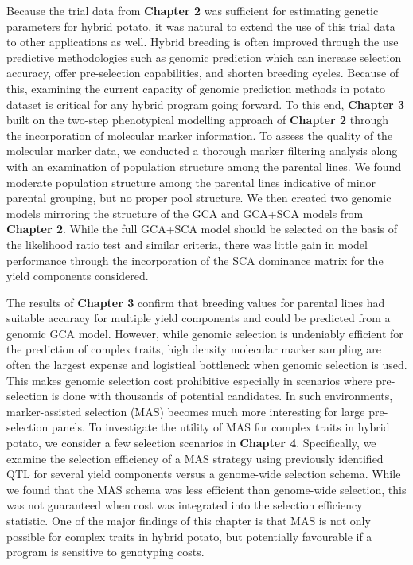 Because the trial data from \textbf{Chapter 2} was sufficient for estimating genetic parameters for hybrid potato, it was natural to extend the use of this trial data to other applications as well. Hybrid breeding is often improved through the use predictive methodologies such as genomic prediction which can increase selection accuracy, offer pre-selection capabilities, and shorten breeding cycles. Because of this, examining the current capacity of genomic prediction methods in potato dataset is critical for any hybrid program going forward. To this end, \textbf{Chapter 3} built on the two-step phenotypical modelling approach of \textbf{Chapter 2} through the incorporation of molecular marker information. To assess the quality of the molecular marker data, we conducted a thorough marker filtering analysis along with an examination of population structure among the parental lines. We found moderate population structure among the parental lines indicative of minor parental grouping, but no proper pool structure. We then created two genomic models mirroring the structure of the GCA and GCA+SCA models from \textbf{Chapter 2}. While the full GCA+SCA model should be selected on the basis of the likelihood ratio test and similar criteria, there was little gain in model performance through the incorporation of the SCA dominance matrix for the yield components considered.

The results of \textbf{Chapter 3} confirm that breeding values for parental lines had suitable accuracy for multiple yield components and could be predicted from a genomic GCA model. However, while genomic selection is undeniably efficient for the prediction of complex traits, high density molecular marker sampling are often the largest expense and logistical bottleneck when genomic selection is used. This makes genomic selection cost prohibitive especially in scenarios where pre-selection is done with thousands of potential candidates. In such environments, marker-assisted selection (MAS) becomes much more interesting for large pre-selection panels. To investigate the utility of MAS for complex traits in hybrid potato, we consider a few selection scenarios in \textbf{Chapter 4}. Specifically, we examine the selection efficiency of a MAS strategy using previously identified QTL for several yield components versus a genome-wide selection schema. While we found that the MAS schema was less efficient than genome-wide selection, this was not guaranteed when cost was integrated into the selection efficiency statistic. One of the major findings of this chapter is that MAS is not only possible for complex traits in hybrid potato, but potentially favourable if a program is sensitive to genotyping costs.

